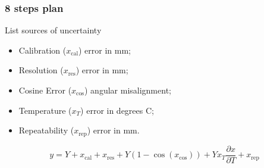 \documentclass[12pt]{beamer}
\newcommand{\fig}[1]{\centering\texttt{[image: \#1]}}
\begin{document}
\begin{frame}
\frametitle{8 steps plan}


\begin{center}
    \end{center}
    
    

\end{frame}

\begin{frame}{List sources of uncertainty}

\begin{itemize} 
\item Calibration ($x_\mathrm{cal}$) error in mm; 
\item Resolution ($x_\mathrm{res}$) error in mm; 
\item Cosine Error ($x_{\cos}$) angular misalignment; 
\item Temperature ($x_T$) error in degrees C; 
\item Repeatability ($x_\mathrm{rep}$) error in mm. 



\end{itemize}

\[ 
y = Y + x_\mathrm{cal} +x_\mathrm{res} +Y \left( 1 - \cos \left( x_{\cos} \right) \right) + Y  x_{T} \frac{\partial x}{\partial T} + x_\mathrm{rep}
\]

\end{frame}
\end{document}
